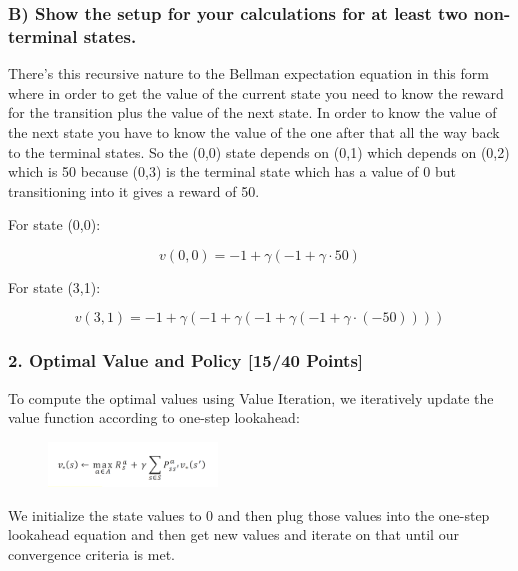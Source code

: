 \documentclass{article}
\begin{document}
\subsubsection*{B) Show the setup for your calculations for at least two non-terminal states.}

There's this recursive nature to the Bellman expectation equation in this form where in order to get the value of the current state you need to know the reward for the transition plus the value of the next state.
In order to know the value of the next state you have to know the value of the one after that all the way back to the terminal states.
So the (0,0) state depends on (0,1) which depends on (0,2) which is 50 because (0,3) is the terminal state which has a value of 0 but transitioning into it gives a reward of 50.

For state (0,0):

\[
v(0,0) = -1 + \gamma \left( -1 + \gamma \cdot 50 \right)
\]

For state (3,1):

\[
v(3,1) = -1 + \gamma \left( -1 + \gamma \left( -1 + \gamma \left( -1 + \gamma \cdot (-50) \right) \right) \right)
\]

\subsubsection*{2. Optimal Value and Policy [15/40 Points]}

To compute the optimal values using Value Iteration, we iteratively update the value function according to one-step lookahead:

\begin{figure}[H]
    \centering
    \includegraphics[width=0.4\textwidth]{valueIter.png}
\end{figure}

We initialize the state values to 0 and then plug those values into the one-step lookahead equation and then get new values and iterate on that until our convergence criteria is met.
\end{document}
